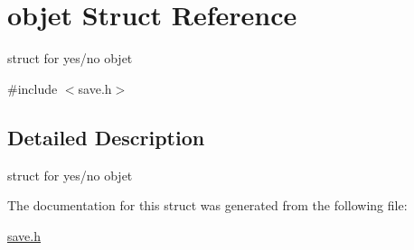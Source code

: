 \hypertarget{structobjet}{}\section{objet Struct Reference}
\label{structobjet}


struct for yes/no objet  




{\ttfamily \#include $<$save.\+h$>$}



\subsection{Detailed Description}
struct for yes/no objet 

The documentation for this struct was generated from the following file\+:\begin{DoxyCompactItemize}
\item 
\hyperlink{save_8h}{save.\+h}\end{DoxyCompactItemize}
